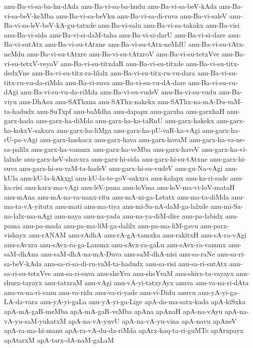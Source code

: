 {anu-Ba-vi-sa-ba-hu-dAda
anu-Ba-vi-sa-ba-hudu
anu-Ba-vi-sa-beV-kAda
anu-Ba-vi-sa-beV-keMba
anu-Ba-vi-sa-beVku
anu-Ba-vi-sa-di-ruva
anu-Ba-vi-saleV
anu-Ba-vi-sa-leV-beV-kA-gu-tatxde
anu-Ba-vi-salu
anu-Ba-vi-sa-takakx
anu-Ba-visi
anu-Ba-vi-sida
anu-Ba-vi-si-daM-taha
anu-Ba-vi-si-darU
anu-Ba-vi-si-dare
anu-Ba-vi-sutAtx
anu-Ba-vi-su-tAtxne
anu-Ba-vi-su-tAtx-neMdU
anu-Ba-vi-su-tAtx-neMdu
anu-Ba-vi-su-tAtxre
anu-Ba-vi-su-tAtxroV
anu-Ba-vi-su-tetxVve
anu-Ba-vi-su-tetxV-veyoV
anu-Ba-vi-su-titxdaR
anu-Ba-vi-su-titxde
anu-Ba-vi-su-titx-dedxVne
anu-Ba-vi-su-titx-ra-lilalx
anu-Ba-vi-su-titx-ru-vu-dara
anu-Ba-vi-su-titx-ru-vu-da-riMda
anu-Ba-vi-suva
anu-Ba-vi-su-vu-dA-dare
anu-Ba-vi-su-vu-dAgi
anu-Ba-vi-su-vu-da-riMda
anu-Ba-vi-su-vudeV
anu-Ba-vi-su-vudu
anu-Ba-viyu
anu-DhAsu
anu-SAThxna
anu-SAThx-nakekx
anu-SAThx-na-mA-Du-vaM-ta-hadudx
anu-SuTxpf
anu-baMdha
anu-dapapx
anu-garxha
anu-garxhaH
anu-garx-hada
anu-garx-ha-diMda
anu-garx-ha-ka-taRnU
anu-garx-hakekx
anu-garx-ha-kokxV-sakxra
anu-garx-ha-liMga
anu-garx-ha-pU-vaR-ka-vAgi
anu-garx-ha-rU-pa-vAgi
anu-garx-hashacx
anu-garx-hava
anu-garx-havaM
anu-garx-ha-va-ne-sa-palilx
anu-garx-ha-vanunx
anu-garx-ha-veMba
anu-garx-haveV
anu-garx-ha-vi-lalxde
anu-garx-heV-shavxra
anu-garx-hi-sida
anu-garx-hi-su-tAtxne
anu-garx-hi-suva
anu-garx-hi-su-vaM-ta-hadeV
anu-garx-hi-su-vudeV
anu-gu-Na-vAgi
anu-kUla
anu-kU-la-kAkxgi
anu-kU-la-te-goV-sakxra
anu-kalapx
anu-ka-ri-sade
anu-ka-risi
anu-karx-ma-vAgi
anu-leV-pana
anu-loVma
anu-loV-ma-vi-loV-mataH
anu-mAna
anu-mA-na-va-nanx-ritu
anu-mA-ni-ga-Letatx
anu-ma-ta-diMda
anu-ma-ta-vA-yitutx
anu-mati
anu-ma-tiya
anu-mi-Sa-nA-daM-ga-lalxde
anu-mi-Sa-na-lalx-ma-nAgi
anu-naya
anu-na-yada
anu-na-ya-diM-dire
anu-pa-labidx
anu-pama
anu-pa-mada
anu-pa-ma-liM-ga-dalilx
anu-pa-ma-liM-gavu
anu-parx-vishayx
anu-rANAM
anu-rAdhA
anu-rA-gA-tamxka
anu-rakitxH
anu-sA-ra-vAgi
anu-sAvxra
anu-sAvx-ra-ga-Lanunx
anu-sAvx-ra-gaLu
anu-sAvx-ra-vanunx
anu-saM-dhAna
anu-saM-dhA-na-mA-Duva
anu-saM-dhA-nisi
anu-sa-raNe
anu-sa-ri-sa-beV-kAda
anu-sa-ri-sa-di-ru-vaM-ta-hadudx
anu-sa-risi
anu-sa-ri-sutAtx
anu-sa-ri-su-tetxVve
anu-sa-ri-suva
anu-sheYva
anu-sheYvaM
anu-shirx-ta-vayayx
anu-shurx-tayayx
anu-tatxraM
anu-vAgi
anu-vA-yi-tatxyAyx
anuva
anu-va-na-ri-dAta
anu-va-na-ri-vanu
anu-va-ridu
anu-va-ri-yade
anu-vi-Didu
anuvu
anu-yA-yi-ga-LA-da-vara
anu-yA-yi-gaLa
anu-yA-yi-ga-Lige
apA-da-ma-satx-kada
apA-kiSxka
apA-mA-gaR-meMba
apA-mA-gaR-veMba
apAna
apAnaH
apA-na-vAyu
apA-na-vA-yu-saM-yukatxM
apA-na-vA-yuvU
apA-na-vA-yu-vina
apA-navu
apAneV
apA-ra-ma-hi-manu
apA-ra-vA-du-da-riMda
apArx-kaq-ta-ri-guMTe
apArxpayx
apAtarxM
apA-tarx-dA-naM-gaLaM
}
